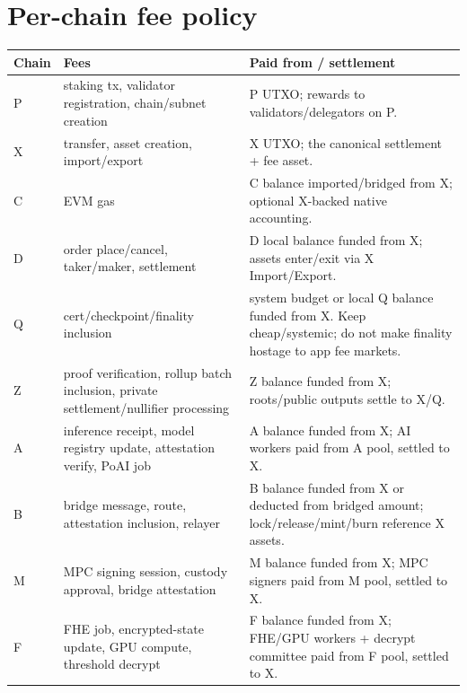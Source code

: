 \documentclass[11pt,letterpaper]{article}
\newcommand{\chain}[1]{\textsf{#1}}
\begin{document}
\section{Per-chain fee policy}

\begin{longtable}{@{}p{1.4cm}p{5.6cm}p{6.0cm}@{}}
\toprule
\textbf{Chain} & \textbf{Fees} & \textbf{Paid from / settlement} \\
\midrule
\endhead
\chain{P} & staking tx, validator registration, chain/subnet creation & \chain{P} UTXO; rewards to validators/delegators on \chain{P}. \\
\chain{X} & transfer, asset creation, import/export & \chain{X} UTXO; the canonical settlement + fee asset. \\
\chain{C} & EVM gas & \chain{C} balance imported/bridged from \chain{X}; optional \chain{X}-backed native accounting. \\
\chain{D} & order place/cancel, taker/maker, settlement & \chain{D} local balance funded from \chain{X}; assets enter/exit via \chain{X} Import/Export. \\
\chain{Q} & cert/checkpoint/finality inclusion & system budget or local \chain{Q} balance funded from \chain{X}. Keep cheap/systemic; do not make finality hostage to app fee markets. \\
\chain{Z} & proof verification, rollup batch inclusion, private settlement/nullifier processing & \chain{Z} balance funded from \chain{X}; roots/public outputs settle to \chain{X}/\chain{Q}. \\
\chain{A} & inference receipt, model registry update, attestation verify, PoAI job & \chain{A} balance funded from \chain{X}; AI workers paid from \chain{A} pool, settled to \chain{X}. \\
\chain{B} & bridge message, route, attestation inclusion, relayer & \chain{B} balance funded from \chain{X} or deducted from bridged amount; lock/release/mint/burn reference \chain{X} assets. \\
\chain{M} & MPC signing session, custody approval, bridge attestation & \chain{M} balance funded from \chain{X}; MPC signers paid from \chain{M} pool, settled to \chain{X}. \\
\chain{F} & FHE job, encrypted-state update, GPU compute, threshold decrypt & \chain{F} balance funded from \chain{X}; FHE/GPU workers + decrypt committee paid from \chain{F} pool, settled to \chain{X}. \\
\bottomrule
\end{longtable}
\end{document}
